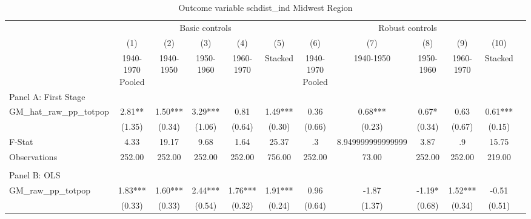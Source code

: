  \begin{table}[htbp]\centering {} \begin{threeparttable} \caption{Outcome variable schdist\_ind Midwest Region} \begin{tabular}{l*{11}{c}} \toprule
          &\multicolumn{5}{c}{Basic controls}                                   &\multicolumn{5}{c}{Robust controls}                                  \\\cmidrule(lr){2-6}\cmidrule(lr){7-11}
          &\multicolumn{1}{c}{(1)}&\multicolumn{1}{c}{(2)}&\multicolumn{1}{c}{(3)}&\multicolumn{1}{c}{(4)}&\multicolumn{1}{c}{(5)}&\multicolumn{1}{c}{(6)}&\multicolumn{1}{c}{(7)}&\multicolumn{1}{c}{(8)}&\multicolumn{1}{c}{(9)}&\multicolumn{1}{c}{(10)}\\
          &\multicolumn{1}{c}{1940-1970 Pooled}&\multicolumn{1}{c}{1940-1950}&\multicolumn{1}{c}{1950-1960}&\multicolumn{1}{c}{1960-1970}&\multicolumn{1}{c}{Stacked}&\multicolumn{1}{c}{1940-1970 Pooled}&\multicolumn{1}{c}{1940-1950}&\multicolumn{1}{c}{1950-1960}&\multicolumn{1}{c}{1960-1970}&\multicolumn{1}{c}{Stacked}\\
\cmidrule(lr){1-11}
\multicolumn{10}{l}{Panel A: First Stage}\\
\cmidrule(lr){1-11}
GM\_hat\_raw\_pp\_totpop&      2.81** &      1.50***&      3.29***&      0.81   &      1.49***&      0.36   &      0.68***&      0.67*  &      0.63   &      0.61***\\
          &    (1.35)   &    (0.34)   &    (1.06)   &    (0.64)   &    (0.30)   &    (0.66)   &    (0.23)   &    (0.34)   &    (0.67)   &    (0.15)   \\
\midrule
F-Stat    &      4.33   &     19.17   &      9.68   &      1.64   &     25.37   &        .3   &8.949999999999999   &      3.87   &        .9   &     15.75   \\
Observations&    252.00   &    252.00   &    252.00   &    252.00   &    756.00   &    252.00   &     73.00   &    252.00   &    252.00   &    219.00   \\
\cmidrule[\heavyrulewidth](lr){1-11} \\ \cmidrule[\heavyrulewidth](lr){1-11}
\multicolumn{10}{l}{Panel B: OLS}\\
\cmidrule(lr){1-11}
GM\_raw\_pp\_totpop&      1.83***&      1.60***&      2.44***&      1.76***&      1.91***&      0.96   &     -1.87   &     -1.19*  &      1.52***&     -0.51   \\
          &    (0.33)   &    (0.33)   &    (0.54)   &    (0.32)   &    (0.24)   &    (0.64)   &    (1.37)   &    (0.68)   &    (0.34)   &    (0.51)   \\

\end{tabular}
\end{threeparttable}
\end{table}
